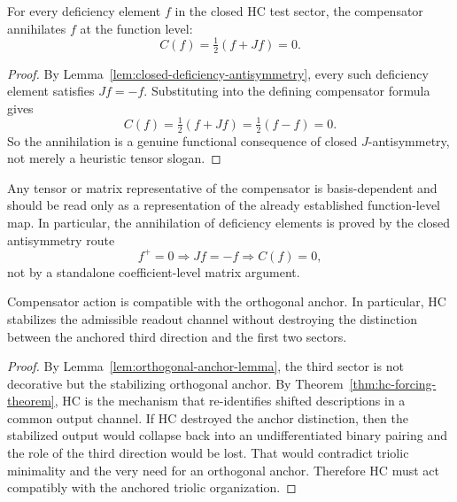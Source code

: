 \begin{proposition}
\label{prop:functional-hc-annihilation}
For every deficiency element $f$ in the closed HC test sector, the compensator
annihilates $f$ at the function level:
\[
 C(f)=\tfrac12(f+Jf)=0.
\]
\end{proposition}

\begin{proof}
By Lemma~\ref{lem:closed-deficiency-antisymmetry}, every such deficiency element
satisfies $Jf=-f$. Substituting into the defining compensator formula gives
\[
 C(f)=\tfrac12(f+Jf)=\tfrac12(f-f)=0.
\]
So the annihilation is a genuine functional consequence of closed
$J$-antisymmetry, not merely a heuristic tensor slogan.
\end{proof}

\begin{remark}
\label{rem:tensor-secondary-functional-proof}
Any tensor or matrix representative of the compensator is basis-dependent and
should be read only as a representation of the already established function-level
map. In particular, the annihilation of deficiency elements is proved by the
closed antisymmetry route
\[
 f^+=0 \Longrightarrow Jf=-f \Longrightarrow C(f)=0,
\]
not by a standalone coefficient-level matrix argument.
\end{remark}

\begin{lemma}
\label{lem:anchor-compatibility-lemma}
Compensator action is compatible with the orthogonal anchor. In particular, HC
stabilizes the admissible readout channel without destroying the distinction
between the anchored third direction and the first two sectors.
\end{lemma}

\begin{proof}
By Lemma~\ref{lem:orthogonal-anchor-lemma}, the third sector is not decorative
but the stabilizing orthogonal anchor. By Theorem~\ref{thm:hc-forcing-theorem},
HC is the mechanism that re-identifies shifted descriptions in a common output
channel. If HC destroyed the anchor distinction, then the stabilized output
would collapse back into an undifferentiated binary pairing and the role of the
third direction would be lost. That would contradict triolic minimality and the
very need for an orthogonal anchor. Therefore HC must act compatibly with the
anchored triolic organization.
\end{proof}

